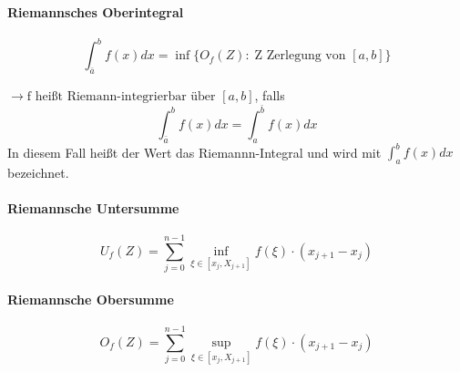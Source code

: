 \documentclass[12pt,a4paper]{article}%
\numberwithin{equation}{section}
\newcommand{\subsubsubsection}{\paragraph}
\numberwithin{equation}{subsection}
\begin{document}
\subsubsubsection{Riemannsches Oberintegral}
\begin{equation}
\int_{\bar{a}}^{b} f(x) dx = \inf\{O_f(Z): \; \text{Z Zerlegung von }[a,b]\}
\end{equation}

$\rightarrow \text{f heißt Riemann-integrierbar über }[a,b]$, falls
\begin{equation}
\int_{\bar{a}}^{b} f(x) dx = \int_a^{\bar{b}} f(x) dx
\end{equation}
\newline
In diesem Fall heißt der Wert das Riemannn-Integral und wird mit $\int_a^b f(x)dx$ bezeichnet.

\subsubsubsection{Riemannsche Untersumme}
\begin{equation}
  U_f(Z) = \sum_{j = 0}^{n-1} \inf\limits_{\xi \in [x_j, X_{j+1}]} f(\xi) \cdot (x_{j+1} -x_j)
\end{equation}
\subsubsubsection{Riemannsche Obersumme}
\begin{equation}
  O_f(Z) = \sum_{j = 0}^{n-1} \sup\limits_{\xi \in [x_j, X_{j+1}]} f(\xi) \cdot (x_{j+1} -x_j)
\end{equation}
\end{document}
